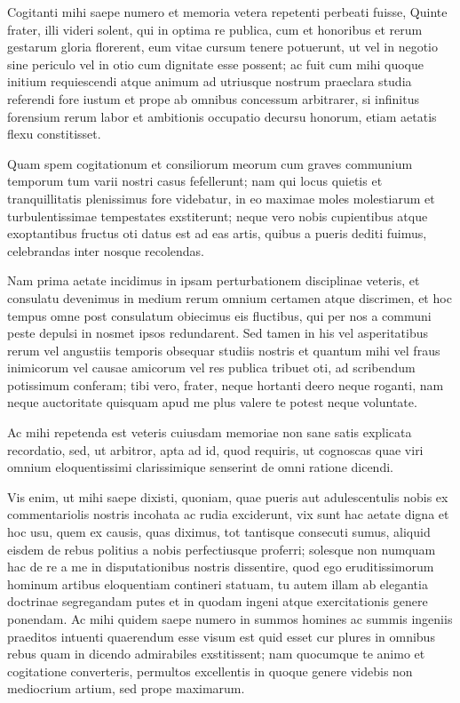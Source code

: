 
 Cogitanti mihi saepe numero et memoria vetera repetenti perbeati fuisse, Quinte frater, illi videri solent, qui in optima re publica, cum et honoribus et rerum gestarum gloria florerent, eum vitae cursum tenere potuerunt, ut vel in negotio sine periculo vel in otio cum dignitate esse possent; ac fuit cum mihi quoque initium requiescendi atque animum ad utriusque nostrum praeclara studia referendi fore iustum et prope ab omnibus concessum arbitrarer, si infinitus forensium rerum labor et ambitionis occupatio decursu honorum, etiam aetatis flexu constitisset.

 Quam spem cogitationum et consiliorum meorum cum graves communium temporum tum varii nostri casus fefellerunt; nam qui locus quietis et tranquillitatis plenissimus fore videbatur, in eo maximae moles molestiarum et turbulentissimae tempestates exstiterunt; neque vero nobis cupientibus atque exoptantibus fructus oti datus est ad eas artis, quibus a pueris dediti fuimus, celebrandas inter nosque recolendas.

 Nam prima aetate incidimus in ipsam perturbationem disciplinae veteris, et consulatu devenimus in medium rerum omnium certamen atque discrimen, et hoc tempus omne post consulatum obiecimus eis fluctibus, qui per nos a communi peste depulsi in nosmet ipsos redundarent. Sed tamen in his vel asperitatibus rerum vel angustiis temporis obsequar studiis nostris et quantum mihi vel fraus inimicorum vel causae amicorum vel res publica tribuet oti, ad scribendum potissimum conferam; tibi vero, frater, neque hortanti deero neque roganti, nam neque auctoritate quisquam apud me plus valere te potest neque voluntate.

 Ac mihi repetenda est veteris cuiusdam memoriae non sane satis explicata recordatio, sed, ut arbitror, apta ad id, quod requiris, ut cognoscas quae viri omnium eloquentissimi clarissimique senserint de omni ratione dicendi.

 Vis enim, ut mihi saepe dixisti, quoniam, quae pueris aut adulescentulis nobis ex commentariolis nostris incohata ac rudia exciderunt, vix sunt hac aetate digna et hoc usu, quem ex causis, quas diximus, tot tantisque consecuti sumus, aliquid eisdem de rebus politius a nobis perfectiusque proferri; solesque non numquam hac de re a me in disputationibus nostris dissentire, quod ego eruditissimorum hominum artibus eloquentiam contineri statuam, tu autem illam ab elegantia doctrinae segregandam putes et in quodam ingeni atque exercitationis genere ponendam. Ac mihi quidem saepe numero in summos homines ac summis ingeniis praeditos intuenti quaerendum esse visum est quid esset cur plures in omnibus rebus quam in dicendo admirabiles exstitissent; nam quocumque te animo et cogitatione converteris, permultos excellentis in quoque genere videbis non mediocrium artium, sed prope maximarum.

